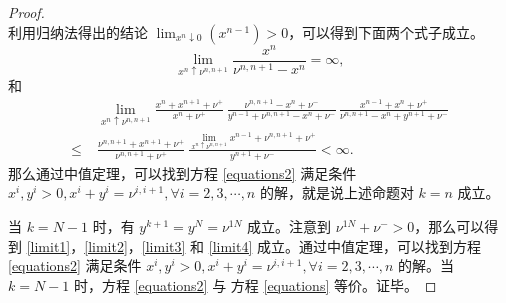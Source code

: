 \begin{appendices}
\begin{proof}
\begin{equation}
    \end{equation}
    利用归纳法得出的结论 $\lim_{x^{n}\downarrow 0}(x^{n-1})>0$，可以得到下面两个式子成立。
    \begin{equation}\label{limit3}
        \lim_{x^{n}\uparrow \nu^{n,n+1}}\frac{x^{n}}{\nu^{n,n+1}-x^{n}}=\infty,
    \end{equation}
    和
    \begin{equation}\label{limit4}
        \begin{split}
            &\;\lim_{x^{n}\uparrow \nu^{n,n+1}}\frac{x^{n}+x^{n+1}+\nu^+}{x^{n}+\nu^+}\,\frac{\nu^{n,n+1}-x^{n}+\nu^-}{y^{n-1}+\nu^{n,n+1}-x^{n}+\nu^-}\,\frac{x^{n-1}+x^{n}+\nu^+}{\nu^{n,n+1}-x^{n}+y^{n+1}+\nu^-}\\
            \le &\;\frac{\nu^{n,n+1}+x^{n+1}+\nu^+}{\nu^{n,n+1}+\nu^+}\,\frac{\lim_{x^{n}\uparrow \nu^{n,n+1}}x^{n-1}+\nu^{n,n+1}+\nu^+}{y^{n+1}+\nu^-}<\infty.
        \end{split}
    \end{equation}
    那么通过中值定理，可以找到方程 \eqref{equations2} 满足条件 $x^{i},y^i>0, x^{i}+y^{i}=\nu^{i,i+1}, \forall i=2,3, \cdots, n$ 的解，就是说上述命题对 $k=n$ 成立。

    当 $k=N-1$ 时，有 $y^{k+1}=y^N=\nu^{1N}$ 成立。注意到 $\nu^{1N}+\nu^->0$，那么可以得到 \eqref{limit1}，\eqref{limit2}，\eqref{limit3} 和 \eqref{limit4} 成立。通过中值定理，可以找到方程 \eqref{equations2} 满足条件 $x^{i},y^i>0, x^{i}+y^{i}=\nu^{i,i+1}, \forall i=2,3, \cdots, n$ 的解。当 $k=N-1$ 时，方程 \eqref{equations2} 与 方程 \eqref{equations} 等价。证毕。


\end{proof}
\end{appendices}
